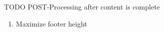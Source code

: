 TODO POST-Processing after content is complete

\begin{enumerate}
    \item Maximize footer height
\end{enumerate}